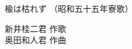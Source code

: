 \documentclass[10pt,b5j]{tarticle} %
\begin{document}
\begin{minipage}[c]{0.7\hsize} %
    \begin{center}
        {\LARGE
            楡は枯れず %
        }
        {\small 
            （昭和五十五年寮歌） %
        }
    \end{center}
\end{minipage}
\begin{minipage}[c]{0.3\hsize} %
    \begin{flushright} %
        新井桂二君 作歌\\奥田和人君 作曲 %
    \end{flushright}
\end{minipage}
\end{document}
